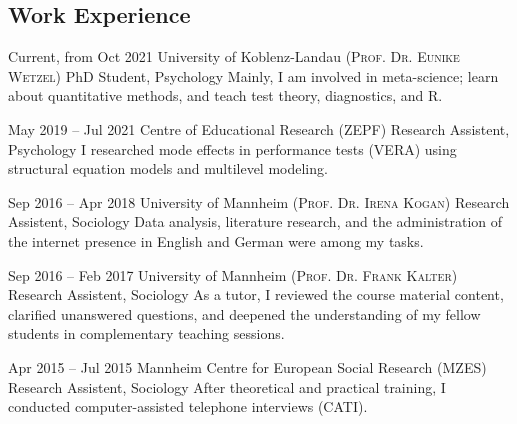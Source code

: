 \documentclass[10pt]{FreemanCV}
\begin{document}
\begin{paracol}{2}
\section{Work Experience}





\jobentry
	{Current, from Oct 2021} 
	{} 
	{University of Koblenz-Landau \hfill{\footnotesize{\textsc{(Prof. Dr. Eunike Wetzel)}}}}
	{PhD Student, Psychology}
	{Mainly, I am involved in meta-science; learn about quantitative methods, and teach test theory, diagnostics, and R.}


\jobentry
	{May 2019 -- Jul 2021}
	{} 
	{Centre of Educational Research
	\hfill\footnotesize{\textsc{(ZEPF)}}}
	{Research Assistent, Psychology}  
	{I researched mode effects in performance tests (\textsc{VERA}) using structural equation models and multilevel modeling.}


\jobentry
	{Sep 2016 -- Apr 2018}
	{} 
	{University of Mannheim
	\hfill\footnotesize{\textsc{(Prof. Dr. Irena Kogan)}}}
	{Research Assistent, Sociology}
	{Data analysis, literature research, and the administration of the internet
	presence in English and German were among my tasks.}


\jobentry
	{Sep 2016 -- Feb 2017}
	{} 
	{University of Mannheim
	\hfill\footnotesize{\textsc{(Prof. Dr. Frank Kalter)}}}
	{Research Assistent, Sociology}
	{As a tutor, I reviewed the course material content, clarified unanswered
	questions, and deepened the understanding of my fellow students in
complementary teaching sessions.}


\jobentry
	{Apr 2015 -- Jul 2015}
	{} 
	{Mannheim Centre for European Social Research
	\hfill\footnotesize{\textsc{(MZES)}}}
	{Research Assistent, Sociology}  
	{After theoretical and practical training, I conducted computer-assisted
	telephone interviews (CATI).}


\end{paracol}
\end{document}
